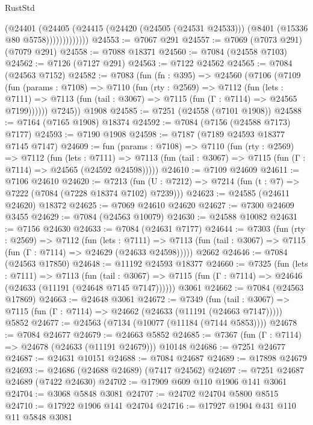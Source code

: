 \begin{lexlean}{RustStd}
\begin{coremodule}
                    (@24401
                      (@24405
                        (@24415
                          (@24420 (@24505 (@24531 @24533)))
                          (@8401 (@15336 @80 @5758)))))))))))))
@24553 := @7067 @291
@24557 := @7069 (@7073 @291) (@7079 @291)
@24558 := @7088 @18371
@24560 := @7084 (@24558 @7103)
@24562 := @7126 (@7127 @291)
@24563 := @7122 @24562
@24565 := @7084 (@24563 @7152)
@24582 := @7083
    (fun (fn : @395) =>
    @24560
      (@7106
        (@7109
          (fun (params : @7108) =>
          @7110
            (fun (rty : @2569) =>
            @7112
              (fun (lets : @7111) =>
              @7113 (fun (tail : @3067) => @7115 (fun (Γ : @7114) => @24565 @7199))))))
        @7245))
    @1908
@24585 := @7251 (@24558 (@7101 @1908))
@24588 := @7164 (@7165 @1908) @18374
@24592 := @7084 (@7156 (@24588 @7173) @7177)
@24593 := @7190 @1908
@24598 := @7187 (@7189 @24593 @18377 @7145 @7147)
@24609 := fun (params : @7108) =>
  @7110
    (fun (rty : @2569) =>
    @7112
      (fun (lets : @7111) =>
      @7113 (fun (tail : @3067) => @7115 (fun (Γ : @7114) => @24565 (@24592 @24598)))))
@24610 := @7109 @24609
@24611 := @7106 @24610
@24620 := @7213
    (fun (U : @7212) => @7214 (fun (t : @7) => @7222 (@7084 (@7228 @18374 @7102) @7239)))
@24623 := @24585 (@24611 @24620) @18372
@24625 := @7069 @24610 @24620
@24627 := @7300 @24609 @3455
@24629 := @7084 (@24563 @10079)
@24630 := @24588 @10082
@24631 := @7156 @24630
@24633 := @7084 (@24631 @7177)
@24644 := @7303
    (fun (rty : @2569) =>
    @7112
      (fun (lets : @7111) =>
      @7113 (fun (tail : @3067) => @7115 (fun (Γ : @7114) => @24629 (@24633 @24598)))))
    @2662
@24646 := @7084 (@24563 @17850)
@24648 := @11192 @24593 @18377
@24660 := @7325
    (fun (lets : @7111) =>
    @7113
      (fun (tail : @3067) =>
      @7115 (fun (Γ : @7114) => @24646 (@24633 (@11191 (@24648 @7145 @7147))))))
    @3061
@24662 := @7084 (@24563 @17869)
@24663 := @24648 @3061
@24672 := @7349
    (fun (tail : @3067) => @7115 (fun (Γ : @7114) => @24662 (@24633 (@11191 (@24663 @7147)))))
    @5852
@24677 := @24563 (@7134 (@10077 (@11184 (@7144 @5853))))
@24678 := @7084 @24677
@24679 := @24663 @5852
@24685 := @7367 (fun (Γ : @7114) => @24678 (@24633 (@11191 @24679))) @10148
@24686 := @7251 @24677
@24687 := @24631 @10151
@24688 := @7084 @24687
@24689 := @17898 @24679
@24693 := @24686 (@24688 @24689) (@7417 @24562)
@24697 := @7251 @24687 @24689 (@7422 @24630)
@24702 := @17909 @609 @110 @1906 @141 @3061
@24704 := @3068 @5848 @3081
@24707 := @24702 @24704 @5800 @8515
@24710 := @17922 @1906 @141 @24704
@24716 := @17927 @1904 @431 @110 @11 @5848 @3081

\end{coremodule}
\end{lexlean}

